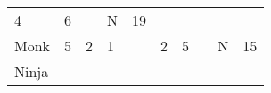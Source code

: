 \documentclass[12pt]{article}
\begin{document}
\begin{longtable}[]{@{}llllllllll@{}}
\begin{minipage}[t]{0.06\columnwidth}\raggedright\strut
4
\strut\end{minipage} &
\begin{minipage}[t]{0.06\columnwidth}\raggedright\strut
6
\strut\end{minipage} &
\begin{minipage}[t]{0.06\columnwidth}\raggedright\strut
\strut\end{minipage} &
\begin{minipage}[t]{0.07\columnwidth}\raggedright\strut
N
\strut\end{minipage} &
\begin{minipage}[t]{0.08\columnwidth}\raggedright\strut
19
\strut\end{minipage}\tabularnewline
\begin{minipage}[t]{0.13\columnwidth}\raggedright\strut
Monk
\strut\end{minipage} &
\begin{minipage}[t]{0.06\columnwidth}\raggedright\strut
5
\strut\end{minipage} &
\begin{minipage}[t]{0.06\columnwidth}\raggedright\strut
2
\strut\end{minipage} &
\begin{minipage}[t]{0.06\columnwidth}\raggedright\strut
1
\strut\end{minipage} &
\begin{minipage}[t]{0.06\columnwidth}\raggedright\strut
\strut\end{minipage} &
\begin{minipage}[t]{0.06\columnwidth}\raggedright\strut
2
\strut\end{minipage} &
\begin{minipage}[t]{0.06\columnwidth}\raggedright\strut
5
\strut\end{minipage} &
\begin{minipage}[t]{0.06\columnwidth}\raggedright\strut
\strut\end{minipage} &
\begin{minipage}[t]{0.07\columnwidth}\raggedright\strut
N
\strut\end{minipage} &
\begin{minipage}[t]{0.08\columnwidth}\raggedright\strut
15
\strut\end{minipage}\tabularnewline
\begin{minipage}[t]{0.13\columnwidth}\raggedright\strut
Ninja
\strut\end{minipage} &

\end{longtable}
\end{document}
